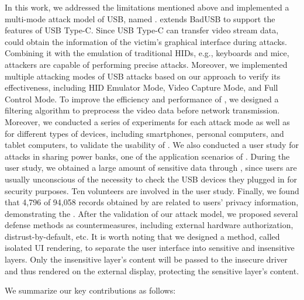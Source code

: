 In this work, we addressed the limitations mentioned
above and implemented a multi-mode attack model of \ac{USB}, named \tool.  \tool
extends BadUSB to support the features of \ac{USB} Type-C.  Since \ac{USB} Type-C can transfer video stream data, \tool could obtain the information of the
victim's graphical interface during attacks.  Combining it with the emulation
of traditional \acp{HID}, e.g., keyboards and mice, attackers are capable of
performing precise attacks.  
Moreover, we implemented multiple attacking
modes of \ac{USB} attacks based on our approach to verify its effectiveness,
including \ac{HID} Emulator Mode, Video Capture Mode, and Full Control Mode.  To improve the
efficiency and performance of \tool, we designed a filtering algorithm to
preprocess the video data before network transmission.  Moreover, we conducted
a series of experiments for each attack mode as well as for different types of
devices, including smartphones, personal computers, and tablet computers, to
validate the usability of \tool.  We also conducted a user study for attacks in
sharing power banks, one of the application scenarios of \tool.  During the
user study, we obtained a large amount of sensitive data through \tool, since
users are usually unconscious of the necessity to check the \ac{USB} devices they
plugged in for security purposes.  
Ten volunteers are involved in the user study.
Finally, we found that 4,796 of 94,058 records obtained by \tool are related to users' privacy information, demonstrating the .
After the validation of our attack model, we
proposed several defense methods as countermeasures, including external
hardware authorization, distrust-by-default, etc.  It is worth noting that we
designed a method, called isolated \ac{UI} rendering, to separate the user interface
into sensitive and insensitive layers.  Only the insensitive layer's content will be passed to the insecure driver and thus rendered on the external display, protecting the sensitive layer's content.

We summarize our key contributions as follows:

